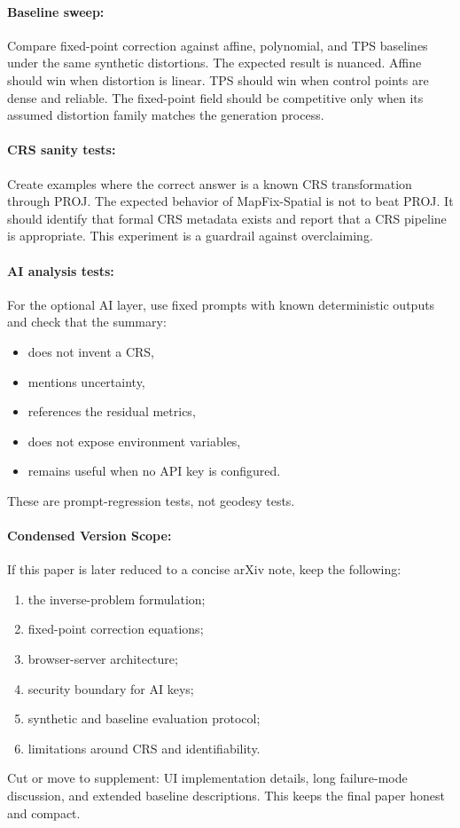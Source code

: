 \documentclass{article}
\begin{document}
\paragraph{Baseline sweep:}

Compare fixed-point correction against affine, polynomial, and TPS baselines under the same synthetic distortions. The expected result is nuanced. Affine should win when distortion is linear. TPS should win when control points are dense and reliable. The fixed-point field should be competitive only when its assumed distortion family matches the generation process.

\paragraph{CRS sanity tests:}

Create examples where the correct answer is a known CRS transformation through PROJ. The expected behavior of MapFix-Spatial is not to beat PROJ. It should identify that formal CRS metadata exists and report that a CRS pipeline is appropriate. This experiment is a guardrail against overclaiming.

\paragraph{AI analysis tests:}

For the optional AI layer, use fixed prompts with known deterministic outputs and check that the summary:
\begin{itemize}
  \item does not invent a CRS,
  \item mentions uncertainty,
  \item references the residual metrics,
  \item does not expose environment variables,
  \item remains useful when no API key is configured.
\end{itemize}
These are prompt-regression tests, not geodesy tests.

\paragraph{Condensed Version Scope:}

If this paper is later reduced to a concise arXiv note, keep the following:
\begin{enumerate}
  \item the inverse-problem formulation;
  \item fixed-point correction equations;
  \item browser-server architecture;
  \item security boundary for AI keys;
  \item synthetic and baseline evaluation protocol;
  \item limitations around CRS and identifiability.
\end{enumerate}
Cut or move to supplement: UI implementation details, long failure-mode discussion, and extended baseline descriptions. This keeps the final paper honest and compact.
\end{document}
